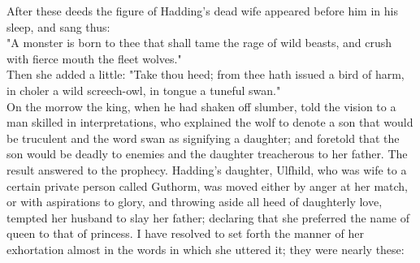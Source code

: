 \documentclass[10pt,a4paper]{report}
\begin{document}
After these deeds the figure of Hadding's dead wife appeared before him in his sleep, and sang thus:\\

"A monster is born to thee that shall tame the rage of wild beasts, and crush with fierce mouth the fleet wolves."\\

Then she added a little: "Take thou heed; from thee hath issued a bird of harm, in choler a wild screech-owl, in tongue a tuneful swan."\\

On the morrow the king, when he had shaken off slumber, told the vision to a man skilled in interpretations, who explained the wolf to denote a son that would be truculent and the word swan as signifying a daughter; and foretold that the son would be deadly to enemies and the daughter treacherous to her father. The result answered to the prophecy. Hadding's daughter, Ulfhild, who was wife to a certain private person called Guthorm, was moved either by anger at her match, or with aspirations to glory, and throwing aside all heed of daughterly love, tempted her husband to slay her father; declaring that she preferred the name of queen to that of princess. I have resolved to set forth the manner of her exhortation almost in the words in which she uttered it; they were nearly these:\\
\end{document}
